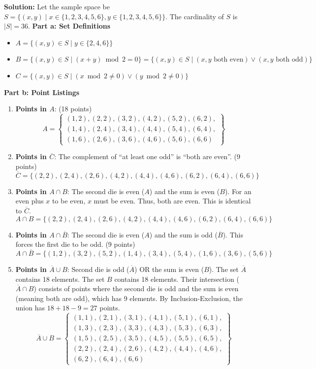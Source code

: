 \documentclass[11pt, letterpaper]{article}
\theoremstyle{definition}
\theoremstyle{remark}
\newcommand{\comp}[1]{\overline{#1}}
\begin{document}
\textbf{Solution:}
Let the sample space be $S = \{(x,y) \mid x \in \{1,2,3,4,5,6\}, y \in \{1,2,3,4,5,6\}\}$. The cardinality of $S$ is $|S| = 36$.
\textbf{Part a: Set Definitions}
\begin{itemize}
    \item $A = \{(x,y) \in S \mid y \in \{2,4,6\}\}$
    \item $B = \{(x,y) \in S \mid (x+y) \bmod 2 = 0\} = \{(x,y) \in S \mid (x,y \text{ both even}) \lor (x,y \text{ both odd})\}$
    \item $C = \{(x,y) \in S \mid (x \bmod 2 \ne 0) \lor (y \bmod 2 \ne 0)\}$
\end{itemize}

\textbf{Part b: Point Listings}
\begin{enumerate}[label=\arabic*.]
    \item \textbf{Points in $A$}: (18 points)
    \[ A = \left\{ \begin{array}{l} (1,2), (2,2), (3,2), (4,2), (5,2), (6,2), \\ (1,4), (2,4), (3,4), (4,4), (5,4), (6,4), \\ (1,6), (2,6), (3,6), (4,6), (5,6), (6,6) \end{array} \right\} \]
    
    \item \textbf{Points in $\comp{C}$}: The complement of ``at least one odd'' is ``both are even''. (9 points)
    \[ \comp{C} = \{(2,2), (2,4), (2,6), (4,2), (4,4), (4,6), (6,2), (6,4), (6,6)\} \]
    
    \item \textbf{Points in $A \cap B$}: The second die is even ($A$) and the sum is even ($B$). For an even plus $x$ to be even, $x$ must be even. Thus, both are even. This is identical to $\comp{C}$.
    \[ A \cap B = \{(2,2), (2,4), (2,6), (4,2), (4,4), (4,6), (6,2), (6,4), (6,6)\} \]
    
    \item \textbf{Points in $A \cap \comp{B}$}: The second die is even ($A$) and the sum is odd ($\comp{B}$). This forces the first die to be odd. (9 points)
    \[ A \cap \comp{B} = \{(1,2), (3,2), (5,2), (1,4), (3,4), (5,4), (1,6), (3,6), (5,6)\} \]
    
    \item \textbf{Points in $\comp{A} \cup B$}: Second die is odd ($\comp{A}$) OR the sum is even ($B$). The set $\comp{A}$ contains 18 elements. The set $B$ contains 18 elements. Their intersection ($\comp{A} \cap B$) consists of points where the second die is odd and the sum is even (meaning both are odd), which has 9 elements. By Inclusion-Exclusion, the union has $18 + 18 - 9 = 27$ points.
    \[ \comp{A} \cup B = \left\{ \begin{array}{l} (1,1), (2,1), (3,1), (4,1), (5,1), (6,1), \\ (1,3), (2,3), (3,3), (4,3), (5,3), (6,3), \\ (1,5), (2,5), (3,5), (4,5), (5,5), (6,5), \\ (2,2), (2,4), (2,6), (4,2), (4,4), (4,6), \\ (6,2), (6,4), (6,6) \end{array} \right\} \]
    

\end{enumerate}
\end{document}
